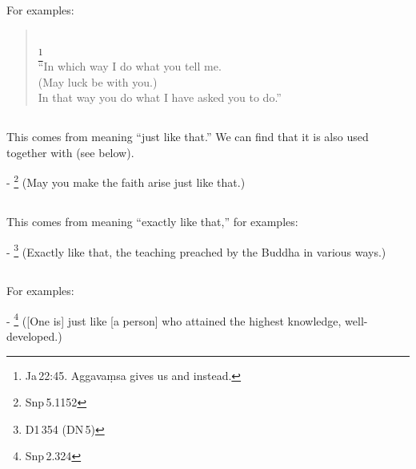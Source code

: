 \subsection*{}\label{nip:yatheva}\label{nip:tatheva}\label{nip:yadeva}\label{nip:tadeva}
For examples:\par
\begin{quote}
\\
\footnote{Ja\,22:45. Aggava\d msa gives us  and  instead.}\\[1.5mm]
``In which way I do what you tell me.\\
(May luck be with you.)\\
In that way you do what I have asked you to do.''
\end{quote}

\subsection*{}\label{nip:evameva}
This comes from  meaning ``just like that.'' We can find that it is also used together with  (see below).\par
- \footnote{Snp\,5.1152} (May you make the faith arise just like that.) \par

\subsection*{}\label{nip:evamevadm}
This comes from  meaning ``exactly like that,'' for examples:\par
- \footnote{D1\,354 (DN\,5)} (Exactly like that, the teaching preached by the Buddha in various ways.) \par

\subsection*{}\label{nip:evampi}
For examples:\par
- \footnote{Snp\,2.324} ([One is] just like [a person] who attained the highest knowledge, well-developed.) \par

